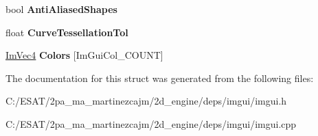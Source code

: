 \begin{DoxyCompactItemize}
\mbox{\label{struct_im_gui_style_ae3c6b2f226fe51631352a637f3defabb}} 
bool {\bfseries Anti\+Aliased\+Shapes}
\item 
\mbox{\label{struct_im_gui_style_a41eb9377b63b8b85ab807c28e00198e9}} 
float {\bfseries Curve\+Tessellation\+Tol}
\item 
\mbox{\label{struct_im_gui_style_a2b4941240a38d1300c39a7fa4f03d0a3}} 
\hyperlink{struct_im_vec4}{Im\+Vec4} {\bfseries Colors} \mbox{[}Im\+Gui\+Col\+\_\+\+C\+O\+U\+NT\mbox{]}
\end{DoxyCompactItemize}


The documentation for this struct was generated from the following files\+:\begin{DoxyCompactItemize}
\item 
C\+:/\+E\+S\+A\+T/2pa\+\_\+ma\+\_\+martinezcajm/2d\+\_\+engine/deps/imgui/imgui.\+h\item 
C\+:/\+E\+S\+A\+T/2pa\+\_\+ma\+\_\+martinezcajm/2d\+\_\+engine/deps/imgui/imgui.\+cpp\end{DoxyCompactItemize}
